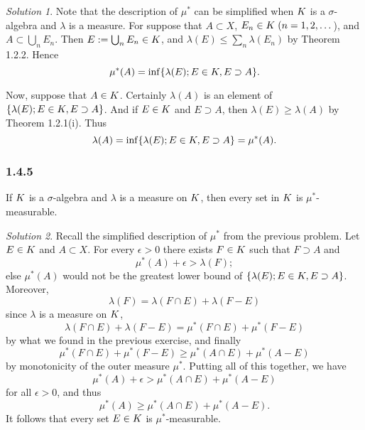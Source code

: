 \documentclass{report}
\let\sc\relax
\newcommand{\sc}[1]{\mathscr{#1}}
\theoremstyle{remark}
\newtheorem*{solution}{Solution}
\begin{document}
\begin{solution}
  Note that the description of $\mu^*$ can be simplified when $\sc K$ is a $\sigma$-algebra and $\lambda$ is a measure. For suppose that $A \subset X$, $E_n \in \sc K \; (n = 1, 2, \dots$), and $A \subset \bigcup_n E_n$. Then $E := \bigcup_n E_n \in \sc K$, and $\lambda(E) \le \sum_n \lambda(E_n)$ by Theorem 1.2.2. Hence
  \begin{equation*}
    \mu^*(A) = \inf \{\lambda(E); E \in \sc K, E \supset A\}.
  \end{equation*}

  Now, suppose that $A \in \sc K$. Certainly $\lambda(A)$ is an element of $\{\lambda(E); E \in \sc K, E \supset A\}$. And if $E \in \sc K$ and $E \supset A$, then $\lambda(E) \ge \lambda(A)$ by Theorem 1.2.1(i). Thus
  \begin{equation*}
    \lambda(A) = \inf \{\lambda(E); E \in \sc K, E \supset A\} = \mu^*(A).
  \end{equation*}
\end{solution}

\subsubsection*{1.4.5}
If $\sc K$ is a $\sigma$-algebra and $\lambda$ is a measure on $\sc K$, then every set in $\sc K$ is $\mu^*$-measurable.

\begin{solution}
  Recall the simplified description of $\mu^*$ from the previous problem. Let $E \in \sc K$ and $A \subset X$. For every $\epsilon > 0$ there exists $F \in \sc K$ such that $F \supset A$ and
  \begin{equation*}
    \mu^*(A) + \epsilon > \lambda(F);
  \end{equation*}
  else $\mu^*(A)$ would not be the greatest lower bound of $\{\lambda(E); E \in \sc K, E \supset A\}$. Moreover,
  \begin{equation*}
    \lambda(F) = \lambda(F \cap E) + \lambda(F - E)
  \end{equation*}
  since $\lambda$ is a measure on $\sc K$,
  \begin{equation*}
    \lambda(F \cap E) + \lambda(F - E) = \mu^*(F \cap E) + \mu^*(F - E) 
  \end{equation*}
  by what we found in the previous exercise, and finally
  \begin{equation*}
    \mu^*(F \cap E) + \mu^*(F - E) \ge \mu^*(A \cap E) + \mu^*(A - E)
  \end{equation*}
  by monotonicity of the outer measure $\mu^*$. Putting all of this together, we have
  \begin{equation*}
    \mu^*(A) + \epsilon > \mu^*(A \cap E) + \mu^*(A - E)
  \end{equation*}
  for all $\epsilon > 0$, and thus
  \begin{equation*}
    \mu^*(A) \ge \mu^*(A \cap E) + \mu^*(A - E).
  \end{equation*}
  It follows that every set $E \in \sc K$ is $\mu^*$-measurable.
\end{solution}
\end{document}

